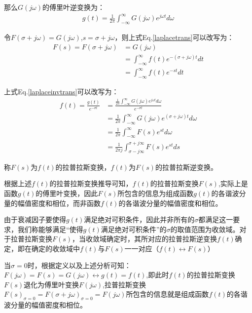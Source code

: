 \documentclass{article}
\numberwithin{equation}{section}
\numberwithin{figure}{section}
\begin{document}
那么$G(j\omega)$的傅里叶逆变换为：
\begin{equation}
    \begin{split}
        g(t)=\frac{1}{2\pi}\int_{-\infty}^{\infty}G(j\omega)e^{j\omega t}d\omega\label{laplaceinvtrans}
    \end{split}
\end{equation}

令$F(\sigma+j\omega)=G(j\omega)$,$s=\sigma+j\omega$，则上式Eq.\ref{laplacetrans}可以改写为：
\begin{equation}
    \begin{split}
        F(s)=F(\sigma+j\omega)&=G(j\omega)\\
        &=\int_{-\infty}^{\infty}f(t)e^{-(\sigma+j\omega) t}dt\\
        &=\int_{-\infty}^{\infty}f(t)e^{-st}dt
    \end{split}
\end{equation}

上式Eq.\ref{laplaceinvtrans}可以改写为：
\begin{equation}
    \begin{split}
        f(t)=\frac{g(t)}{e^{-\sigma t}}&=\frac{\frac{1}{2\pi}\int_{-\infty}^{\infty}G(j\omega)e^{j\omega t}d\omega}{e^{-\sigma t}}\\
        &=\frac{1}{2\pi}\int_{-\infty}^{\infty}G(j\omega)e^{(\sigma + j\omega) t}d\omega\\
        &=\frac{1}{2\pi}\int_{-\infty}^{\infty}F(s)e^{st}d\omega\\
        &=\frac{1}{2\pi j}\int_{\sigma-j\infty}^{\sigma+j\infty}F(s)e^{st}ds
    \end{split}   
\end{equation}

称$F(s)$为$f(t)$的拉普拉斯变换，$f(t)$为$F(s)$的拉普拉斯逆变换。

根据上述$f(t)$的拉普拉斯变换推导可知，$f(t)$的拉普拉斯变换$F(s)$,实际上是函数$g(t)$的傅里叶变换，因此$F(s)$所包含的信息为组成函数$g(t)$的各谐波分量的幅值密度和相位，而非函数$f(t)$的各谐波分量的幅值密度和相位。

由于衰减因子要使得$g(t)$满足绝对可积条件，因此并非所有的$\sigma$都满足这一要求，我们称能够满足“使得$g(t)$满足绝对可积条件”的$\sigma$的取值范围为收敛域。对于拉普拉斯变换$F(s)$，当收敛域确定时，其所对应的拉普拉斯逆变换$f(t)$确定，即在确定的收敛域中$f(t)$与$F(s)$一一对应（$f(t)\leftrightarrow F(s)$）

当$\sigma=0$时，根据定义以及上述分析可知：$F(j\omega)=F(s)=G(j\omega)\leftrightarrow g(t)=f(t)$,即此时$f(t)$的拉普拉斯变换$F(s)$退化为傅里叶变换$F(j\omega)$,拉普拉斯变换$F(s)_{\sigma = 0}=F(\sigma+j\omega)_{\sigma = 0}=F(j\omega)$所包含的信息就是组成函数$f(t)$的各谐波分量的幅值密度和相位。
\end{document}
